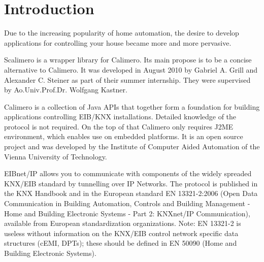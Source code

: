\chapter{Introduction}

Due to the increasing popularity of home automation, the desire to develop applications for controlling your house became more and more pervasive.

Scalimero is a wrapper library for Calimero. Its main propose is to be a concise alternative to Calimero. It was developed in August 2010 by Gabriel A. Grill and Alexander C. Steiner as part of their summer internship. They were supervised by Ao.Univ.Prof.Dr. Wolfgang Kastner.

Calimero is a collection of Java APIs that together form a foundation for building applications controlling EIB/KNX installations. Detailed knowledge of the protocol is not required. On the top of that Calimero only requires J2ME environment, which enables use on embedded platforms. It is an open source project and was developed by the Institute of Computer Aided Automation of the Vienna University of Technology.

EIBnet/IP allows you to communicate with components of the widely spreaded KNX/EIB standard by tunnelling over IP Networks. The protocol is published in the KNX Handbook and in the European standard EN 13321-2:2006 (Open Data Communication in Building Automation, Controls and Building Management - Home and Building Electronic Systems - Part 2: KNXnet/IP Communication), available from European standardization organizations. Note: EN 13321-2 is useless without information on the KNX/EIB control network specific data structures (cEMI, DPTs); these should be defined in EN 50090 (Home and Building Electronic Systems).


